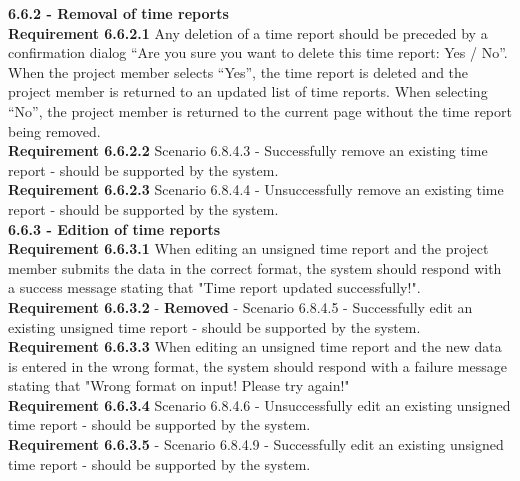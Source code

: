 \documentclass{article}
\begin{document}
{\fontsize{11}{11}\selectfont \noindent\textbf{6.6.2 - Removal of time reports}} \\
\noindent\textbf{Requirement 6.6.2.1} Any deletion of a time report should be preceded by a confirmation dialog “Are you sure you want to delete this time report: Yes / No”. When the project member selects “Yes”, the time report is deleted and the project member is returned to an updated list of time reports. When selecting “No”, the project member is returned to the current page without the time report being removed. \\
\textbf{Requirement 6.6.2.2} Scenario 6.8.4.3 - Successfully remove an existing time report - should be supported by the system. \\
\textbf{Requirement 6.6.2.3} Scenario 6.8.4.4 - Unsuccessfully remove an existing time report - should be supported by the system. \\



{\fontsize{11}{11}\selectfont \noindent\textbf{6.6.3 - Edition of time reports}} \\
\noindent
\textbf{Requirement 6.6.3.1} When editing an unsigned time report and the project member submits the data in the correct format, the system should respond with a success message stating that "Time report updated successfully!".\\
\textbf{Requirement 6.6.3.2} - \textbf{Removed} - Scenario 6.8.4.5 - Successfully edit an existing unsigned time report - should be supported by the system.\\
\textbf{Requirement 6.6.3.3} When editing an unsigned time report and the new data is entered in the wrong format, the system should respond with a failure message stating that "Wrong format on input! Please try again!"\\
\textbf{Requirement 6.6.3.4} Scenario 6.8.4.6 - Unsuccessfully edit an existing unsigned time report - should be supported by the system.\\
\textbf{Requirement 6.6.3.5} - Scenario 6.8.4.9 - Successfully edit an existing unsigned time report - should be supported by the system.\\
\end{document}
